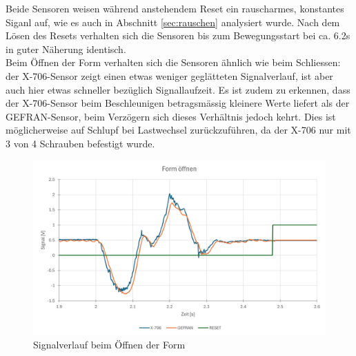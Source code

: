 \documentclass[12pt,a4paper]{article}
\begin{document}
Beide Sensoren weisen während anstehendem Reset ein rauscharmes, konstantes Siganl auf, wie es auch in Abschnitt \ref{sec:rauschen} analysiert wurde. Nach dem Lösen des Resets verhalten sich die Sensoren bis zum Bewegungsstart bei ca. 6.2s in guter Näherung identisch.\\
Beim Öffnen der Form verhalten sich die Sensoren ähnlich wie beim Schliessen: der X-706-Sensor zeigt einen etwas weniger geglätteten Signalverlauf, ist aber auch hier etwas schneller bezüglich Signallaufzeit. Es ist zudem zu erkennen, dass der X-706-Sensor beim Beschleunigen betragsmässig kleinere Werte liefert als der GEFRAN-Sensor, beim Verzögern sich dieses Verhältnis jedoch kehrt. Dies ist möglicherweise auf Schlupf bei Lastwechsel zurückzuführen, da der X-706 nur mit 3 von 4 Schrauben befestigt wurde.
\begin{figure}[H]
	\centering
	\includegraphics[width=1\linewidth]{imgs/form_oeffnen}
	\caption{Signalverlauf beim Öffnen der Form}
	\label{fig:formoeffnen}
\end{figure}
\end{document}
